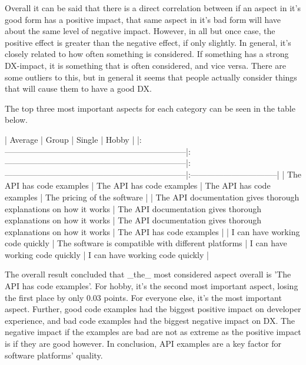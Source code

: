 \documentclass[11pt]{article}
\begin{document}
\begin{multicols}{2}
    Overall it can be said that there is a direct correlation between if an
    aspect in it's good form has a positive impact, that same aspect in it's
    bad form will have about the same level of negative impact. However, in
    all but once case, the positive effect is greater than the negative
    effect, if only slightly. In general, it's closely related to how often
    something is considered. If something has a strong DX-impact, it is
    something that is often considered, and vice versa. There are some
    outliers to this, but in general it seems that people actually consider
    things that will cause them to have a good DX.

    The top three most important aspects for each category can be seen in
    the table below.

    |                              Average                              |                               Group                               |                              Single                               |              Hobby              |
    |:------------------------------------------------------------------|:------------------------------------------------------------------|:------------------------------------------------------------------|:--------------------------------|
    | The API has code examples                                         | The API has code examples                                         | The API has code examples                                         | The pricing of the software     |
    | The API documentation gives thorough explanations on how it works | The API documentation gives thorough explanations on how it works | The API documentation gives thorough explanations on how it works | The API has code examples       |
    | I can have working code quickly                                   | The software is compatible with different platforms               | I can have working code quickly                                   | I can have working code quickly |


    The overall result concluded that _the_ most considered aspect overall
    is 'The API has code examples'. For hobby, it's the second most
    important aspect, losing the first place by only 0.03 points. For
    everyone else, it's the most important aspect. Further, good code
    examples had the biggest positive impact on developer experience, and
    bad code examples had the biggest negative impact on DX. The negative
    impact if the examples are bad are not as extreme as the positive impact
    is if they are good however. In conclusion, API examples are a key
    factor for software platforms' quality.


\end{multicols}
\end{document}
